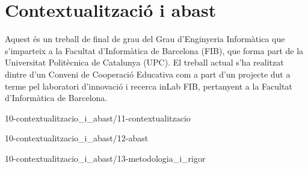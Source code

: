 \chapter{Contextualització i abast}

Aquest és un treball de final de grau del Grau d'Enginyeria Informàtica que s'imparteix a la Facultat d'Informàtica de Barcelona (FIB), que forma part de la Universitat Politècnica de Catalunya (UPC). El treball actual s'ha realitzat dintre d'un Conveni de Cooperació Educativa com a part d'un projecte dut a terme pel laboratori d'innovació i recerca inLab FIB, pertanyent a la Facultat d'Informàtica de Barcelona.

{10-contextualitzacio_i_abast/11-contextualitzacio}

{10-contextualitzacio_i_abast/12-abast}

{10-contextualitzacio_i_abast/13-metodologia_i_rigor}

\begin{comment}
1 Contextualització i abast
1.1 Contextualització 
    1.1.1 Context 
    1.1.2 Problema a resoldre 
    1.1.3 Actors implicats 
    [?] 1.1.4 Justificació
    1.1.5 Lleis i regulacions 
1.2 Abast 
    1.2.1 Objectius 
    1.2.2 Requeriments funcionals 
    1.2.3 Requeriments no funcionals 
    1.2.4 Obstacles i riscos potencials 
1.3 Metodologia i rigor 
    1.3.1 Metodologia 
    1.3.2 Eines 
\end{comment}